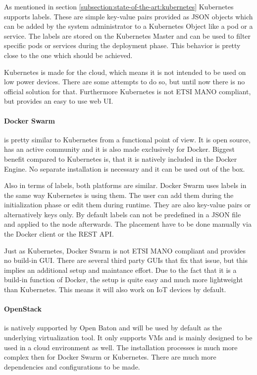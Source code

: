 As mentioned in section \ref{subsection:state-of-the-art:kubernetes} Kubernetes supports labels.
These are simple key-value pairs provided as \ac{JSON} objects which can be added by the system administrator to a Kubernetes Object like a pod or a service.
The labels are stored on the Kubernetes Master and can be used to filter specific pods or services during the deployment phase.
This behavior is pretty close to the one which should be achieved.

Kubernetes is made for the cloud, which means it is not intended to be used on low power devices.
There are some attempts\autocite{kubernetes-installer-rpi}\autocite{kubernetes-on-arm}\autocite{hypriot:kubernetes-on-rpi} to do so, but until now there is no official solution for that.
Furthermore Kubernetes is not \ac{ETSI} \ac{MANO} compliant, but provides an easy to use web \ac{UI}.

\paragraph{Docker Swarm} is pretty similar to Kubernetes from a functional point of view.
It is open source, has an active community and it is also made exclusively for Docker.
Biggest benefit compared to Kubernetes is, that it is natively included in the Docker Engine.
No separate installation is necessary and it can be used out of the box.

Also in terms of labels, both platforms are similar.
Docker Swarm uses labels in the same way Kubernetes is using them.
The user can add them during the initialization phase or edit them during runtime.
They are also key-value pairs or alternatively keys only.
By default labels can not be predefined in a \ac{JSON} file and applied to the node afterwards.
The placement have to be done manually via the Docker client or the \ac{REST} \ac{API}.

Just as Kubernetes, Docker Swarm is not \ac{ETSI} \ac{MANO} compliant and provides no build-in \ac{GUI}.
There are several third party \acp{GUI} that fix that issue, but this implies an additional setup and maintance effort.
Due to the fact that it is a build-in function of Docker, the setup is quite easy and much more lightweight than Kubernetes.
This means it will also work on \ac{IoT} devices by default.

\paragraph{OpenStack} is natively supported by Open Baton and will be used by default as the underlying virtualization tool.
It only supports \acp{VM} and is mainly designed to be used in a cloud environment as well.
The installation processes is much more complex then for Docker Swarm or Kubernetes.
There are much more dependencies and configurations to be made.

